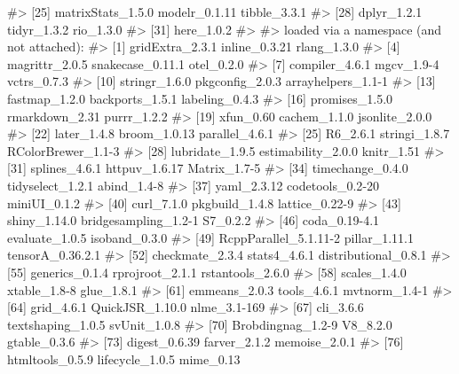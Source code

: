 \documentclass[
  italian,
  letterpaper,
  a4paper,
  11pt,
  open=any]{scrbook}
\newenvironment{Shaded}{\begin{snugshade}}{\end{snugshade}}
\newcommand{\CommentTok}[1]{\textcolor[rgb]{0.37,0.37,0.37}{#1}}
\theoremstyle{plain}
\theoremstyle{definition}
\theoremstyle{definition}
\theoremstyle{remark}
\begin{document}
\begin{tcolorbox}
\begin{Shaded}
\begin{Highlighting}[]
\CommentTok{\#\textgreater{} [25] matrixStats\_1.5.0     modelr\_0.1.11         tibble\_3.3.1         }
\CommentTok{\#\textgreater{} [28] dplyr\_1.2.1           tidyr\_1.3.2           rio\_1.3.0            }
\CommentTok{\#\textgreater{} [31] here\_1.0.2           }
\CommentTok{\#\textgreater{} }
\CommentTok{\#\textgreater{} loaded via a namespace (and not attached):}
\CommentTok{\#\textgreater{}  [1] gridExtra\_2.3.1       inline\_0.3.21         rlang\_1.3.0          }
\CommentTok{\#\textgreater{}  [4] magrittr\_2.0.5        snakecase\_0.11.1      otel\_0.2.0           }
\CommentTok{\#\textgreater{}  [7] compiler\_4.6.1        mgcv\_1.9{-}4            vctrs\_0.7.3          }
\CommentTok{\#\textgreater{} [10] stringr\_1.6.0         pkgconfig\_2.0.3       arrayhelpers\_1.1{-}1   }
\CommentTok{\#\textgreater{} [13] fastmap\_1.2.0         backports\_1.5.1       labeling\_0.4.3       }
\CommentTok{\#\textgreater{} [16] promises\_1.5.0        rmarkdown\_2.31        purrr\_1.2.2          }
\CommentTok{\#\textgreater{} [19] xfun\_0.60             cachem\_1.1.0          jsonlite\_2.0.0       }
\CommentTok{\#\textgreater{} [22] later\_1.4.8           broom\_1.0.13          parallel\_4.6.1       }
\CommentTok{\#\textgreater{} [25] R6\_2.6.1              stringi\_1.8.7         RColorBrewer\_1.1{-}3   }
\CommentTok{\#\textgreater{} [28] lubridate\_1.9.5       estimability\_2.0.0    knitr\_1.51           }
\CommentTok{\#\textgreater{} [31] splines\_4.6.1         httpuv\_1.6.17         Matrix\_1.7{-}5         }
\CommentTok{\#\textgreater{} [34] timechange\_0.4.0      tidyselect\_1.2.1      abind\_1.4{-}8          }
\CommentTok{\#\textgreater{} [37] yaml\_2.3.12           codetools\_0.2{-}20      miniUI\_0.1.2         }
\CommentTok{\#\textgreater{} [40] curl\_7.1.0            pkgbuild\_1.4.8        lattice\_0.22{-}9       }
\CommentTok{\#\textgreater{} [43] shiny\_1.14.0          bridgesampling\_1.2{-}1  S7\_0.2.2             }
\CommentTok{\#\textgreater{} [46] coda\_0.19{-}4.1         evaluate\_1.0.5        isoband\_0.3.0        }
\CommentTok{\#\textgreater{} [49] RcppParallel\_5.1.11{-}2 pillar\_1.11.1         tensorA\_0.36.2.1     }
\CommentTok{\#\textgreater{} [52] checkmate\_2.3.4       stats4\_4.6.1          distributional\_0.8.1 }
\CommentTok{\#\textgreater{} [55] generics\_0.1.4        rprojroot\_2.1.1       rstantools\_2.6.0     }
\CommentTok{\#\textgreater{} [58] scales\_1.4.0          xtable\_1.8{-}8          glue\_1.8.1           }
\CommentTok{\#\textgreater{} [61] emmeans\_2.0.3         tools\_4.6.1           mvtnorm\_1.4{-}1        }
\CommentTok{\#\textgreater{} [64] grid\_4.6.1            QuickJSR\_1.10.0       nlme\_3.1{-}169         }
\CommentTok{\#\textgreater{} [67] cli\_3.6.6             textshaping\_1.0.5     svUnit\_1.0.8         }
\CommentTok{\#\textgreater{} [70] Brobdingnag\_1.2{-}9     V8\_8.2.0              gtable\_0.3.6         }
\CommentTok{\#\textgreater{} [73] digest\_0.6.39         farver\_2.1.2          memoise\_2.0.1        }
\CommentTok{\#\textgreater{} [76] htmltools\_0.5.9       lifecycle\_1.0.5       mime\_0.13}
\end{Highlighting}
\end{Shaded}

\end{tcolorbox}
\end{document}
